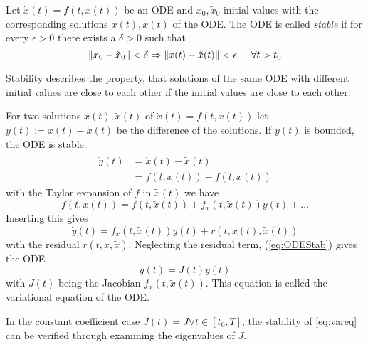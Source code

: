 \documentclass[a4paper, 12pt]{scrreprt} %
\begin{document}
\begin{definition}[Stability]
Let $\dot x(t) = f\left(t,x(t)\right)$ be an \ac{ODE} and $x_0, \tilde{x}_0$ initial values with the corresponding solutions $x(t), \tilde{x}(t)$ of the \ac{ODE}. The \ac{ODE} is called \emph{stable} if for every $\epsilon > 0$ there exists a $\delta > 0$ such that
\begin{equation}
\Vert x_0 - \tilde{x}_0 \Vert < \delta \Rightarrow \Vert x(t) - \tilde{x}(t) \Vert < \epsilon \hspace{0.5cm} \forall t > t_0
\label{eq:Stab}
\end{equation}
\end{definition}

Stability describes the property, that solutions of the same \ac{ODE} with different initial values are close to each other if the initial values are close to each other. %

For two solutions $x(t), \tilde{x}(t)$ of $\dot x(t) = f\left(t,x(t)\right)$ let $y(t) := x(t) - \tilde{x}(t)$ be the difference of the solutions. If $y(t)$ is bounded, the \ac{ODE} is stable.
\begin{align*}
\dot{y}(t) &= \dot{x}(t) - \dot{\tilde{x}}(t) \\
 &= f\left(t,x(t)\right) - f\left(t,\tilde{x}(t)\right)
\end{align*}
with the Taylor expansion of $f$ in $\tilde{x}(t)$ we have 
\begin{equation*}
f(t,x(t)) = f(t,\tilde{x}(t)) + f_x(t,\tilde{x}(t)) y(t) + \dots
\end{equation*}
Inserting this gives
\begin{equation}
\dot{y}(t) = f_x(t,\tilde{x}(t)) y(t) + r(t,x(t),\tilde{x}(t))%
\label{eq:ODEStab}
\end{equation}
with the residual $r(t,x,\tilde{x})$. 
Neglecting the residual term, (\ref{eq:ODEStab}) gives the \ac{ODE}
\begin{equation}
\dot{y}(t) = J(t) y(t)
\label{eq:vareq}
\end{equation}
with $J(t)$ being the Jacobian $f_x(t,\tilde{x}(t))$. This equation is called the variational equation of the \ac{ODE}.

In the constant coefficient case $J(t) = J \forall t \in [t_0,T]$, the stability of \ref{eq:vareq} can be verified through examining the eigenvalues of $J$.
\end{document}
